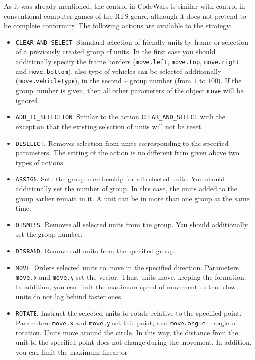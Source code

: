 As it was already mentioned, the control in CodeWars is similar with control in conventional computer games of the RTS genre, although it does not pretend to be complete conformity. The following actions are available to the strategy:
\begin{itemize}
    \item \texttt{CLEAR\_AND\_SELECT}. Standard selection of friendly units by frame or selection of a previously created group of units. In the
        first case you should additionally specify the frame borders (\texttt{move.left}, \texttt{move.top}, \texttt{move.right} and
        \texttt{move.bottom}), also type of vehicles can be selected additionally (\texttt{move.vehicleType}), in the second – group number (from
        $1$ to $100$). If the group number is given, then all other parameters of the object \texttt{move} will be ignored.
    \item \texttt{ADD\_TO\_SELECTION}. Similar to the action \texttt {CLEAR\_AND\_SELECT} with the exception that the existing selection of units
        will not be reset.
    \item \texttt{DESELECT}. Removes selection from units corresponding to the specified parameters. The setting of the action is no different from
        given above two types of actions.
    \item \texttt{ASSIGN}. Sets the group membership for all selected units. You should additionally set the number of
        group. In this case, the units added to the group earlier remain in it. A unit can be in more than one group at the same time.
    \item \texttt{DISMISS}. Removes all selected units from the group. You should additionally set the group number.
    \item \texttt{DISBAND}. Removes all units from the specified group.
    \item \texttt{MOVE}. Orders selected units to move in the specified direction. Parameters \texttt{move.x} and \texttt{move.y}
        set the vector. Thus, units move, keeping the formation. In addition, you can limit the maximum speed
        of movement so that slow units do not lag behind faster ones.
    \item \texttt{ROTATE}. Instruct the selected units to rotate relative to the specified point. Parameters \texttt{move.x} and
        \texttt{move.y} set this point, and \texttt{move.angle} -- angle of rotation. Units move around the circle. In this way,
        the distance from the unit to the specified point does not change during the movement. In addition, you can limit the maximum linear or

\end{itemize}
